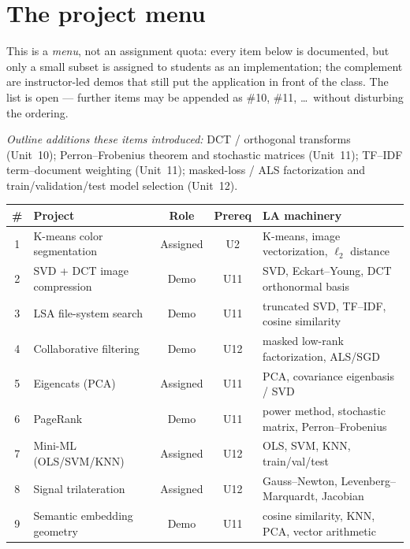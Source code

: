 \documentclass[11pt]{article}
\begin{document}
\section{The project menu}
This is a \emph{menu}, not an assignment quota: every item below is documented,
but only a small subset is assigned to students as an implementation; the
complement are instructor-led demos that still put the application in front of
the class. The list is open --- further items may be appended as \#10, \#11,
\dots\ without disturbing the ordering.

\smallskip
\noindent\emph{Outline additions these items introduced:} DCT / orthogonal
transforms (Unit~10); Perron--Frobenius theorem and stochastic matrices
(Unit~11); TF--IDF term--document weighting (Unit~11); masked-loss / ALS
factorization and train/validation/test model selection (Unit~12).

\begin{center}
\renewcommand{\arraystretch}{1.25}
\begin{tabular}{@{}c l c c p{4.6cm}@{}}
\toprule
\textbf{\#} & \textbf{Project} & \textbf{Role} & \textbf{Prereq} & \textbf{LA machinery} \\
\midrule
1 & K-means color segmentation   & Assigned & U2  & K-means, image vectorization, $\ell_2$ distance \\
2 & SVD + DCT image compression  & Demo     & U11 & SVD, Eckart--Young, DCT orthonormal basis \\
3 & LSA file-system search       & Demo     & U11 & truncated SVD, TF--IDF, cosine similarity \\
4 & Collaborative filtering      & Demo     & U12 & masked low-rank factorization, ALS/SGD \\
5 & Eigencats (PCA)              & Assigned & U11 & PCA, covariance eigenbasis / SVD \\
6 & PageRank                     & Demo     & U11 & power method, stochastic matrix, Perron--Frobenius \\
7 & Mini-ML (OLS/SVM/KNN)        & Assigned & U12 & OLS, SVM, KNN, train/val/test \\
8 & Signal trilateration         & Assigned & U12 & Gauss--Newton, Levenberg--Marquardt, Jacobian \\
9 & Semantic embedding geometry  & Demo     & U11 & cosine similarity, KNN, PCA, vector arithmetic \\
\bottomrule
\end{tabular}
\end{center}
\end{document}
